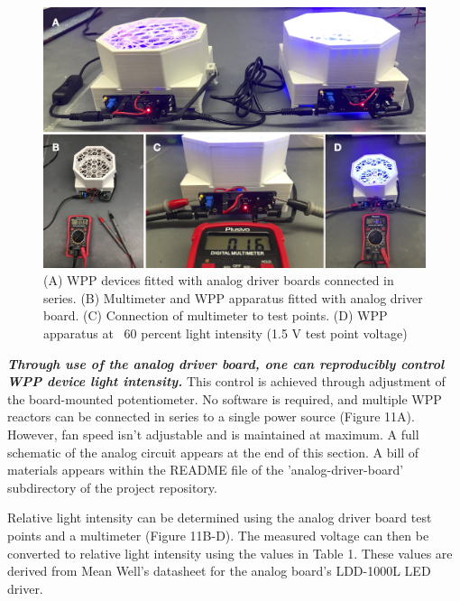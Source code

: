 \documentclass[11pt]{article}
\begin{document}
\begin{figure}[H]
	\centering
	\includegraphics[width=\textwidth]{"./fig11.png"}
	\caption{(A) WPP devices fitted with analog driver boards connected in series. (B) Multimeter and WPP apparatus fitted with analog driver board. (C) Connection of multimeter to test points. (D) WPP apparatus at ~60 percent light intensity (1.5 V test point voltage)}
\end{figure}

\textbf{\textit{Through use of the analog driver board, one can reproducibly control WPP device light intensity.}}
This control is achieved through adjustment of the board-mounted potentiometer.
No software is required, and multiple WPP reactors can be connected in series to a single power source (Figure 11A).
However, fan speed isn’t adjustable and is maintained at maximum.
A full schematic of the analog circuit appears at the end of this section.
A bill of materials appears within the README file of the 'analog-driver-board' subdirectory of the project repository.

Relative light intensity can be determined using the analog driver board test points and a multimeter (Figure 11B-D).
The measured voltage can then be converted to relative light intensity using the values in Table 1.
These values are derived from Mean Well's datasheet for the analog board’s LDD-1000L LED driver.
\end{document}
